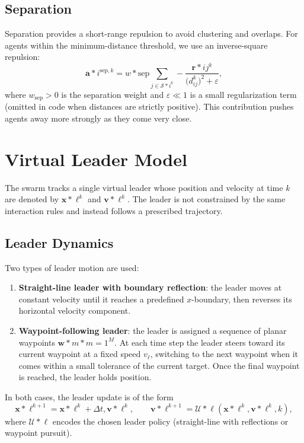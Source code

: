 \documentclass[12pt]{article}
\begin{document}
\subsection{Separation}
Separation provides a short-range repulsion to avoid clustering and overlaps. For agents within the minimum-distance threshold, we use an inverse-square repulsion:
\begin{equation}
\mathbf{a}*i^{\mathrm{sep},k} = w*\mathrm{sep} \sum_{j \in \mathcal{S}*i^k} -\frac{\mathbf{r}*{ij}^k}{\bigl(d_{ij}^k\bigr)^2 + \varepsilon},
\end{equation}
where $w_\mathrm{sep} > 0$ is the separation weight and $\varepsilon \ll 1$ is a small regularization term (omitted in code when distances are strictly positive). This contribution pushes agents away more strongly as they come very close.

\section{Virtual Leader Model}
The swarm tracks a single virtual leader whose position and velocity at time $k$ are denoted by $\mathbf{x}*\ell^k$ and $\mathbf{v}*\ell^k$. The leader is not constrained by the same interaction rules and instead follows a prescribed trajectory.

\subsection{Leader Dynamics}
Two types of leader motion are used:
\begin{enumerate}
\item \textbf{Straight-line leader with boundary reflection}: the leader moves at constant velocity until it reaches a predefined $x$-boundary, then reverses its horizontal velocity component.
\item \textbf{Waypoint-following leader}: the leader is assigned a sequence of planar waypoints ${\mathbf{w}*m}*{m=1}^M$. At each time step the leader steers toward its current waypoint at a fixed speed $v_\ell$, switching to the next waypoint when it comes within a small tolerance of the current target. Once the final waypoint is reached, the leader holds position.
\end{enumerate}
In both cases, the leader update is of the form
\begin{equation}
\mathbf{x}*\ell^{k+1} = \mathbf{x}*\ell^k + \Delta t, \mathbf{v}*\ell^k, \qquad \mathbf{v}*\ell^{k+1} = \mathcal{U}*\ell(\mathbf{x}*\ell^k, \mathbf{v}*\ell^k, k),
\end{equation}
where $\mathcal{U}*\ell$ encodes the chosen leader policy (straight-line with reflections or waypoint pursuit).
\end{document}
